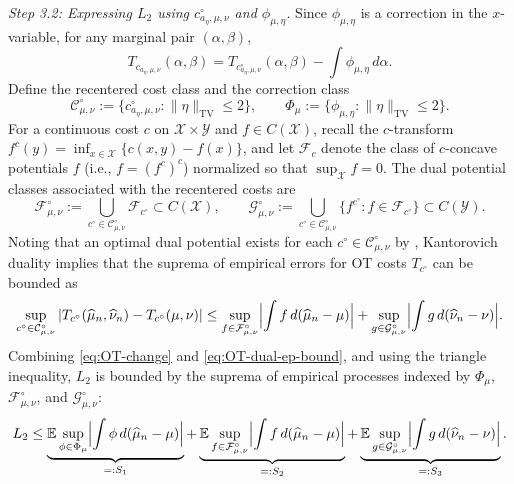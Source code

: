 \documentclass[11pt]{amsart}
\theoremstyle{definition}
\theoremstyle{remark}
\newcommand{\E}{\mathbb{E}}
\newcommand{\1}{\mathbf{1}}
\numberwithin{equation}{section}
\newcommand{\TV}{\mathrm{TV}}
\begin{document}
\emph{Step 3.2: Expressing $L_2$ using $c^\circ_{a_\eta,\mu,\nu}$ and $\phi_{\mu,\eta}$.}
Since $\phi_{\mu,\eta}$ is a correction in the $x$-variable, for any marginal pair $(\alpha,\beta)$,
\begin{equation}\label{eq:OT-change}
    T_{c_{a_\eta,\mu,\nu}}(\alpha,\beta)
= T_{c^\circ_{a_\eta,\mu,\nu}}(\alpha,\beta) - \int \phi_{\mu,\eta}\,d\alpha.
\end{equation}
Define the recentered cost class and the correction class
\[\mathcal C^\circ_{\mu,\nu}
:= \bigl\{c^\circ_{a_\eta,\mu,\nu}: \|\eta\|_{\TV}\le 2\bigr\},
\qquad
\Phi_\mu := \bigl\{\phi_{\mu,\eta}: \|\eta\|_{\TV}\le 2\bigr\}.\]
For a continuous cost $c$ on $\mathcal{X}\times\mathcal{Y}$ and
$f\in C(\mathcal{X})$, recall the $c$-transform
$f^{c}(y)=\inf_{x\in\mathcal X}\{c(x,y)-f(x)\}$, and let $\mathcal F_c$
denote the class of $c$-concave potentials $f$ (i.e., $f=(f^c)^c$)
normalized so that $\sup_{\mathcal X}f=0$. The dual potential classes
associated with the recentered costs are
\begin{equation}\label{eq:potential-classes}
  \mathcal F^\circ_{\mu,\nu}
   := \bigcup_{c^\circ\in\mathcal C^\circ_{\mu,\nu}}\mathcal F_{c^\circ}
   \subset C(\mathcal X),
  \qquad
  \mathcal G^\circ_{\mu,\nu}
   := \bigcup_{c^\circ\in\mathcal C^\circ_{\mu,\nu}}
      \bigl\{f^{c^\circ}: f\in\mathcal F_{c^\circ}\bigr\}
   \subset C(\mathcal Y).
\end{equation}
Noting that an optimal dual potential exists for each
$c^\circ \in \mathcal C^\circ_{\mu,\nu}$
by \cite[Theorem~5.10(iii)]{villani2009optimal}, Kantorovich duality implies that the suprema of 
empirical errors for OT costs $T_{c^\circ}$ can be bounded as
\begin{equation}\label{eq:OT-dual-ep-bound}
\sup_{c^\circ\in \mathcal C^\circ_{\mu,\nu}}
\left|T_{c^\circ}(\widehat\mu_n,\widehat\nu_n)
- T_{c^\circ}(\mu,\nu)\right|
\leq
\sup_{f\in\mathcal F^\circ_{\mu,\nu}}
\Bigl|\int f\,d(\widehat{\mu}_n-\mu)\Bigr|
+\sup_{g\in\mathcal G^\circ_{\mu,\nu}}
\Bigl|\int g\,d(\widehat{\nu}_n-\nu)\Bigr|.
\end{equation}
Combining \eqref{eq:OT-change} and \eqref{eq:OT-dual-ep-bound}, and using the triangle inequality, $L_2$ is bounded by
the suprema of empirical processes indexed by $\Phi_{\mu}$,
$\mathcal F^\circ_{\mu,\nu}$, and
$\mathcal G^\circ_{\mu,\nu}$:
\begin{equation}\label{eq:G22-three-terms}
 L_2
 \leq
 \underbrace{
 \E\sup_{\phi\in\Phi_\mu}\Bigl|\int \phi\,d(\widehat{\mu}_n-\mu)\Bigr|
 }_{=:S_1}
+\underbrace{
 \E\sup_{f\in\mathcal F^\circ_{\mu,\nu}}
 \Bigl|\int f\,d(\widehat{\mu}_n-\mu)\Bigr|
 }_{=:S_2}
+\underbrace{
 \E\sup_{g\in\mathcal G^\circ_{\mu,\nu}}
 \Bigl|\int g\,d(\widehat{\nu}_n-\nu)\Bigr|
 }_{=:S_3}.
\end{equation}
\end{document}
